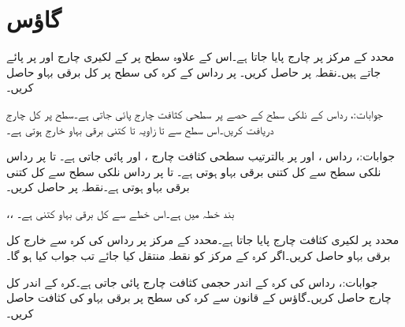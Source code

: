 \section*{گاؤس}
محدد کے مرکز پر  چارج پایا جاتا ہے۔اس کے علاوہ  سطح پر  کے لکیری چارج  اور  پر پائے جاتے ہیں۔نقطہ  پر  حاصل کریں۔ پر رداس  کے کرہ کی سطح پر کل برقی بہاو  حاصل کریں۔ 

جوابات:، 
رداس  کے نلکی سطح کے  حصے  پر سطحی کثافت چارج  پائی جاتی ہے۔سطح پر کل چارج دریافت کریں۔اس سطح سے  تا  زاویہ  تا  کتنی برقی بہاو خارج ہوتی ہے۔

جوابات:، 
رداس ،  اور  پر بالترتیب سطحی کثافت چارج ،  اور  پائی جاتی ہے۔  تا   پر رداس  نلکی سطح سے کل کتنی برقی بہاو ہوتی ہے۔ تا   پر رداس  نلکی سطح سے کل کتنی برقی بہاو ہوتی ہے۔نقطہ  پر  حاصل کریں۔

،،
بند خطہ  میں  ہے۔اس خطے سے کل برقی بہاو کتنی ہے۔

محدد  پر لکیری کثافت چارج  پایا جاتا ہے۔محدد کے مرکز پر رداس  کی کرہ سے خارج کل برقی بہاو حاصل کریں۔اگر کرہ کے مرکز کو نقطہ  منتقل کیا جائے تب جواب کیا ہو گا۔

جوابات:، 
رداس  کی کرہ کے اندر حجمی کثافت چارج  پائی جاتی ہے۔کرہ کے اندر کل چارج حاصل کریں۔گاؤس کے قانون سے کرہ کی سطح پر برقی بہاو کی کثافت حاصل کریں۔

